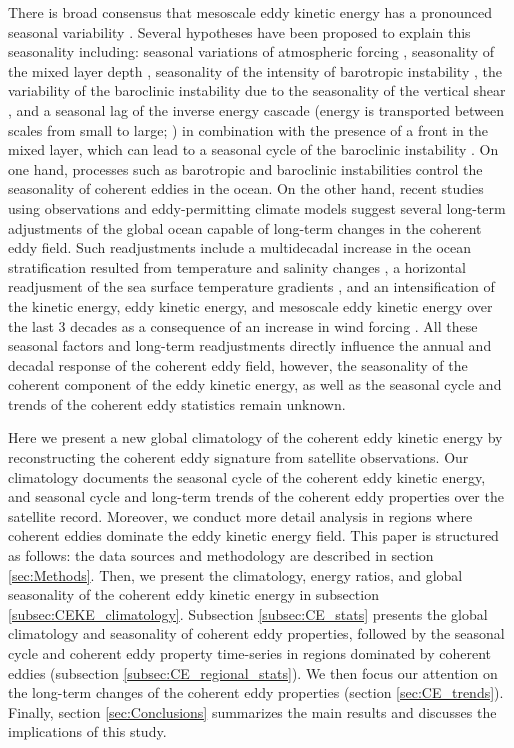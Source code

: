 \documentclass[draft,linenumbers]{agujournal2019}
\begin{document}
There is broad consensus that mesoscale eddy kinetic energy has a pronounced seasonal variability \citep{Uchida_Seasonality_2017,Kang_On_2017,Qiu_seasonal_2004, Qiu_seasonal_1999}. Several hypotheses have been proposed to explain this seasonality including: seasonal variations of atmospheric forcing \citep{Sasaki_seasonal_2014}, seasonality of the mixed layer depth \citep{Qiu_seasonal_2014,Callies_season_2015}, seasonality of the intensity of barotropic instability \citep{Qiu_seasonal_2004}, the variability of the baroclinic instability due to the seasonality of the vertical shear \citep{Qiu_seasonal_1999}, and a seasonal lag of the inverse energy cascade (energy is transported between scales from small to large; \citealp{Arbic_cascade_2013}) in combination with the presence of a front in the mixed layer, which can lead to a seasonal cycle of the baroclinic instability \citep{Qiu_seasonal_2014}. On one hand, processes such as barotropic and baroclinic instabilities control the seasonality of coherent eddies in the ocean. 
On the other hand, recent studies using observations and eddy-permitting climate models suggest several long-term adjustments of the global ocean capable of long-term changes in the coherent eddy field. 
Such readjustments include a multidecadal increase in the ocean stratification resulted from temperature and salinity changes \citep{Li_stratification_2020}, a horizontal readjusment of the sea surface temperature gradients \citep{Ruela_SST_trends_2020,Bouali_SST_grad_trends_2017,Cane_SST_trends_1997}, and an intensification of the kinetic energy, eddy kinetic energy, and mesoscale eddy kinetic energy over the last 3 decades as a consequence of an increase in wind forcing \citep{Hu_acceleration_2020,Wunsch_speeding_2020,Martinez_Kinetic_2021}. All these seasonal factors and long-term readjustments directly influence the annual and decadal response of the coherent eddy field, however, the seasonality of the coherent component of the eddy kinetic energy, as well as the seasonal cycle and trends of the coherent eddy statistics remain unknown.

Here we present a new global climatology of the coherent eddy kinetic energy by reconstructing the coherent eddy signature from satellite observations. Our climatology documents the seasonal cycle of the coherent eddy kinetic energy, and seasonal cycle and long-term trends of the coherent eddy properties over the satellite record. 
Moreover, we conduct more detail analysis in regions where coherent eddies dominate the eddy kinetic energy field. 
This paper is structured as follows:  the data sources and methodology are described in section \ref{sec:Methods}.
Then, we present the climatology, energy ratios, and global seasonality of the coherent eddy kinetic energy in subsection \ref{subsec:CEKE_climatology}. 
Subsection \ref{subsec:CE_stats} presents the global climatology and seasonality of coherent eddy properties, followed by the seasonal cycle and coherent eddy property time-series in regions dominated by coherent eddies (subsection \ref{subsec:CE_regional_stats}). 
We then focus our attention on the long-term changes of the coherent eddy properties (section \ref{sec:CE_trends}). 
Finally, section \ref{sec:Conclusions} summarizes the main results and discusses the implications of this study.
\end{document}
